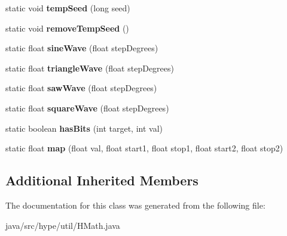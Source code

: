 \begin{DoxyCompactItemize}
\item 
\hypertarget{classhype_1_1util_1_1_h_math_aaa0f2ca11fbdaaa363c5c29ff1acf58b}{static void {\bfseries temp\-Seed} (long seed)}\label{classhype_1_1util_1_1_h_math_aaa0f2ca11fbdaaa363c5c29ff1acf58b}

\item 
\hypertarget{classhype_1_1util_1_1_h_math_a6209cbef5f9754065c2a7cdc38b43665}{static void {\bfseries remove\-Temp\-Seed} ()}\label{classhype_1_1util_1_1_h_math_a6209cbef5f9754065c2a7cdc38b43665}

\item 
\hypertarget{classhype_1_1util_1_1_h_math_a70432ca80abf61919404cd778100304a}{static float {\bfseries sine\-Wave} (float step\-Degrees)}\label{classhype_1_1util_1_1_h_math_a70432ca80abf61919404cd778100304a}

\item 
\hypertarget{classhype_1_1util_1_1_h_math_ad485c46a803bce9ecb67ffbc995e027a}{static float {\bfseries triangle\-Wave} (float step\-Degrees)}\label{classhype_1_1util_1_1_h_math_ad485c46a803bce9ecb67ffbc995e027a}

\item 
\hypertarget{classhype_1_1util_1_1_h_math_ae2cbf7905c5ec87a10ea532f2164f861}{static float {\bfseries saw\-Wave} (float step\-Degrees)}\label{classhype_1_1util_1_1_h_math_ae2cbf7905c5ec87a10ea532f2164f861}

\item 
\hypertarget{classhype_1_1util_1_1_h_math_a8fd18e82bb54ba01f12b3b87d329ec5f}{static float {\bfseries square\-Wave} (float step\-Degrees)}\label{classhype_1_1util_1_1_h_math_a8fd18e82bb54ba01f12b3b87d329ec5f}

\item 
\hypertarget{classhype_1_1util_1_1_h_math_af99cc1d7b58081d9f54187f49bfca833}{static boolean {\bfseries has\-Bits} (int target, int val)}\label{classhype_1_1util_1_1_h_math_af99cc1d7b58081d9f54187f49bfca833}

\item 
\hypertarget{classhype_1_1util_1_1_h_math_a0398dbad7de59e58af8982a9130bec5b}{static float {\bfseries map} (float val, float start1, float stop1, float start2, float stop2)}\label{classhype_1_1util_1_1_h_math_a0398dbad7de59e58af8982a9130bec5b}

\end{DoxyCompactItemize}
\subsection*{Additional Inherited Members}


The documentation for this class was generated from the following file\-:\begin{DoxyCompactItemize}
\item 
java/src/hype/util/H\-Math.\-java\end{DoxyCompactItemize}

